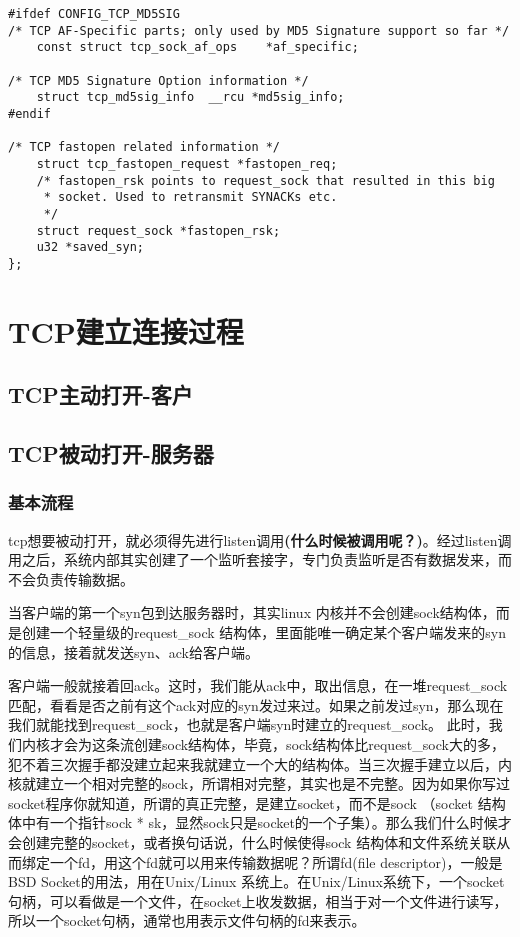 \documentclass[11pt, a4paper,oneside]{book}
\theoremstyle{ocrenumbox}
\theoremstyle{purplenumbox}
\theoremstyle{blackbox}
\begin{document}
\begin{verbatim}
#ifdef CONFIG_TCP_MD5SIG
/* TCP AF-Specific parts; only used by MD5 Signature support so far */
	const struct tcp_sock_af_ops	*af_specific;

/* TCP MD5 Signature Option information */
	struct tcp_md5sig_info	__rcu *md5sig_info;
#endif

/* TCP fastopen related information */
	struct tcp_fastopen_request *fastopen_req;
	/* fastopen_rsk points to request_sock that resulted in this big
	 * socket. Used to retransmit SYNACKs etc.
	 */
	struct request_sock *fastopen_rsk;
	u32	*saved_syn;
};

\end{verbatim}
\chapter{TCP建立连接过程}
    \section{TCP主动打开-客户}
    \section{TCP被动打开-服务器}
        \subsection{基本流程}
            tcp想要被动打开，就必须得先进行listen调用\textbf{(什么时候被调用呢？)}。经过listen调用之后，系统内部其实创建了一个监听套接字，专门负责监听是否有数据发来，而不会负责传输数据。

            当客户端的第一个syn包到达服务器时，其实linux 内核并不会创建sock结构体，而是创建一个轻量级的request\_sock 结构体，里面能唯一确定某个客户端发来的syn的信息，接着就发送syn、ack给客户端。

            客户端一般就接着回ack。这时，我们能从ack中，取出信息，在一堆request\_sock匹配，看看是否之前有这个ack对应的syn发过来过。如果之前发过syn，那么现在我们就能找到request\_sock，也就是客户端syn时建立的request\_sock。 此时，我们内核才会为这条流创建sock结构体，毕竟，sock结构体比request\_sock大的多，犯不着三次握手都没建立起来我就建立一个大的结构体。当三次握手建立以后，内核就建立一个相对完整的sock，所谓相对完整，其实也是不完整。因为如果你写过socket程序你就知道，所谓的真正完整，是建立socket，而不是sock （socket 结构体中有一个指针sock * sk，显然sock只是socket的一个子集）。那么我们什么时候才会创建完整的socket，或者换句话说，什么时候使得sock 结构体和文件系统关联从而绑定一个fd，用这个fd就可以用来传输数据呢？所谓fd(file descriptor)，一般是BSD Socket的用法，用在Unix/Linux 系统上。在Unix/Linux系统下，一个socket句柄，可以看做是一个文件，在socket上收发数据，相当于对一个文件进行读写，所以一个socket句柄，通常也用表示文件句柄的fd来表示。
\end{document}
